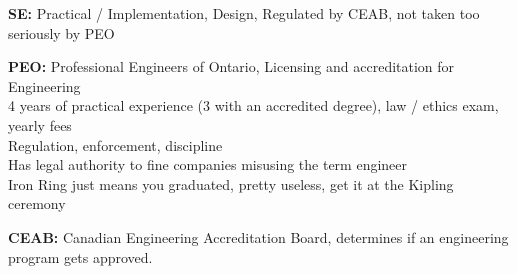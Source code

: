 \documentclass[letterpaper, 8pt]{extarticle}
\begin{document}
\begin{multicols*}{6}
  \textbf{SE:} Practical / Implementation, Design,
  Regulated by CEAB, not taken too seriously by PEO

  \textbf{PEO:} Professional Engineers of Ontario, Licensing and accreditation for Engineering \\
  4 years of practical experience (3 with an accredited degree), law / ethics exam, yearly fees \\
  Regulation, enforcement, discipline \\
  Has legal authority to fine companies misusing the term engineer \\
  Iron Ring just means you graduated, pretty useless, get it at the Kipling ceremony

  \textbf{CEAB:} Canadian Engineering Accreditation Board,
  determines if an engineering program gets approved.


\end{multicols*}
\end{document}
